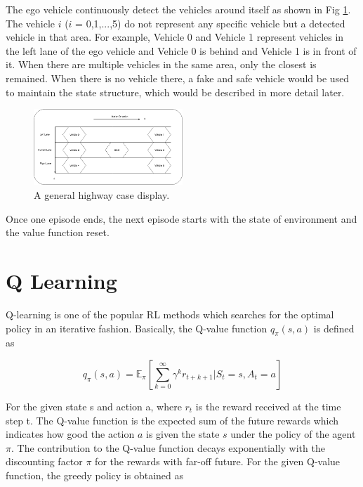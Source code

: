 The ego vehicle continuously detect the vehicles around itself as shown in Fig \ref{fig:highway}. The vehicle $i$ ($i$ = 0,1,...,5) do not represent any specific vehicle but a detected vehicle in that area. For example, Vehicle 0 and Vehicle 1 represent vehicles in the left lane of the ego vehicle and Vehicle 0 is behind and Vehicle 1 is in front of it. When there are multiple vehicles in the same area, only the closest is remained. When there is no vehicle there, a fake and safe vehicle would be used to maintain the state structure, which would be described in more detail later.

\begin{figure}[h]
\centering
\includegraphics[width=0.5\textwidth]{figs/ch4/Highway-Display}
\caption{A general highway case display.}
\label{fig:highway}
\end{figure}

Once one episode ends, the next episode starts with the state of environment and the value function reset.


\section{Q Learning}

Q-learning is one of the popular RL methods which searches for the optimal policy in an iterative fashion. Basically, the Q-value function $q_{\pi} (s, a)$ is defined as

\begin{equation}
q_\pi(s,a) = \mathbb{E}_\pi \left[ \sum _{k=0}^{\infty} \gamma ^k r_{t+k+1} | S_t = s, A_t = a \right]
\end{equation}

For the given state s and action a, where $r_t$ is the reward received at the time step t. The Q-value function is the expected sum of the future rewards which indicates how good the action $a$ is given the state $s$ under the policy of the agent $\pi$. The contribution to the Q-value function decays exponentially with the discounting factor $\pi$ for the rewards with far-off future. For the given Q-value function, the greedy policy is obtained as

